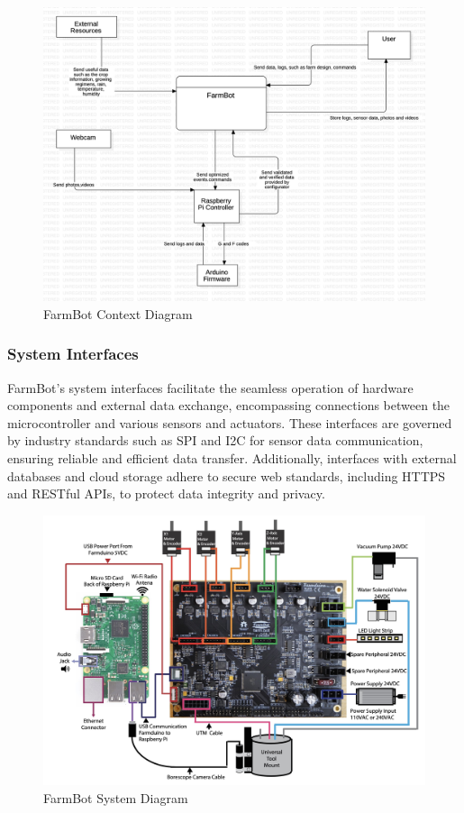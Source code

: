 \begin{figure}[H]
    \centering
\includegraphics[scale=0.2]{./Figures/farmbot_context_diagram.png}
\caption{FarmBot Context Diagram}
\end{figure}

\subsubsection{System Interfaces}
FarmBot's system interfaces facilitate the seamless operation of hardware components and external data exchange, encompassing connections between the microcontroller and various sensors and actuators. These interfaces are governed by industry standards such as SPI and I2C for sensor data communication, ensuring reliable and efficient data transfer. Additionally, interfaces with external databases and cloud storage adhere to secure web standards, including HTTPS and RESTful APIs, to protect data integrity and privacy.

\begin{figure}[H]
    \centering
\includegraphics[scale=0.2]{./Figures/farmbot_system_diagram.jpeg}
\caption{FarmBot System Diagram}
\end{figure}


